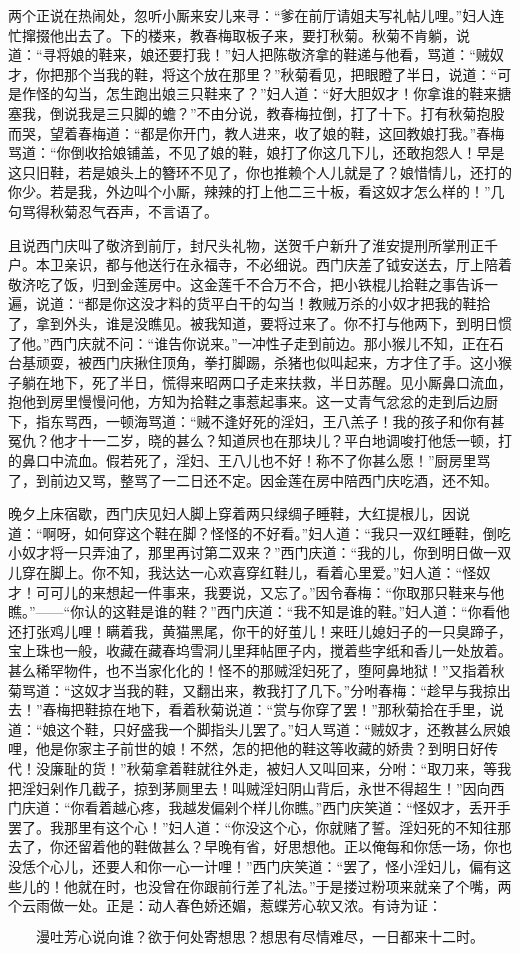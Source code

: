 两个正说在热闹处，忽听小厮来安儿来寻：“爹在前厅请姐夫写礼帖儿哩。”妇人连忙撺掇他出去了。下的楼来，教春梅取板子来，要打秋菊。秋菊不肯躺，说道：“寻将娘的鞋来，娘还要打我！”妇人把陈敬济拿的鞋递与他看，骂道：“贼奴才，你把那个当我的鞋，将这个放在那里？”秋菊看见，把眼瞪了半日，说道：“可是作怪的勾当，怎生跑出娘三只鞋来了？”妇人道：“好大胆奴才！你拿谁的鞋来搪塞我，倒说我是三只脚的蟾？”不由分说，教春梅拉倒，打了十下。打有秋菊抱股而哭，望着春梅道：“都是你开门，教人进来，收了娘的鞋，这回教娘打我。”春梅骂道：“你倒收拾娘铺盖，不见了娘的鞋，娘打了你这几下儿，还敢抱怨人！早是这只旧鞋，若是娘头上的簪环不见了，你也推赖个人儿就是了？娘惜情儿，还打的你少。若是我，外边叫个小厮，辣辣的打上他二三十板，看这奴才怎么样的！”几句骂得秋菊忍气吞声，不言语了。

且说西门庆叫了敬济到前厅，封尺头礼物，送贺千户新升了淮安提刑所掌刑正千户。本卫亲识，都与他送行在永福寺，不必细说。西门庆差了钺安送去，厅上陪着敬济吃了饭，归到金莲房中。这金莲千不合万不合，把小铁棍儿拾鞋之事告诉一遍，说道：“都是你这没才料的货平白干的勾当！教贼万杀的小奴才把我的鞋拾了，拿到外头，谁是没瞧见。被我知道，要将过来了。你不打与他两下，到明日惯了他。”西门庆就不问：“谁告你说来。”一冲性子走到前边。那小猴儿不知，正在石台基顽耍，被西门庆揪住顶角，拳打脚踢，杀猪也似叫起来，方才住了手。这小猴子躺在地下，死了半日，慌得来昭两口子走来扶救，半日苏醒。见小厮鼻口流血，抱他到房里慢慢问他，方知为拾鞋之事惹起事来。这一丈青气忿忿的走到后边厨下，指东骂西，一顿海骂道：“贼不逢好死的淫妇，王八羔子！我的孩子和你有甚冤仇？他才十一二岁，晓的甚么？知道屄也在那块儿？平白地调唆打他恁一顿，打的鼻口中流血。假若死了，淫妇、王八儿也不好！称不了你甚么愿！”厨房里骂了，到前边又骂，整骂了一二日还不定。因金莲在房中陪西门庆吃酒，还不知。

晚夕上床宿歇，西门庆见妇人脚上穿着两只绿绸子睡鞋，大红提根儿，因说道：“啊呀，如何穿这个鞋在脚？怪怪的不好看。”妇人道：“我只一双红睡鞋，倒吃小奴才将一只弄油了，那里再讨第二双来？”西门庆道：“我的儿，你到明日做一双儿穿在脚上。你不知，我达达一心欢喜穿红鞋儿，看着心里爱。”妇人道：“怪奴才！可可儿的来想起一件事来，我要说，又忘了。”因令春梅：“你取那只鞋来与他瞧。”——“你认的这鞋是谁的鞋？”西门庆道：“我不知是谁的鞋。”妇人道：“你看他还打张鸡儿哩！瞒着我，黄猫黑尾，你干的好茧儿！来旺儿媳妇子的一只臭蹄子，宝上珠也一般，收藏在藏春坞雪洞儿里拜帖匣子内，搅着些字纸和香儿一处放着。甚么稀罕物件，也不当家化化的！怪不的那贼淫妇死了，堕阿鼻地狱！”又指着秋菊骂道：“这奴才当我的鞋，又翻出来，教我打了几下。”分咐春梅：“趁早与我掠出去！”春梅把鞋掠在地下，看着秋菊说道：“赏与你穿了罢！”那秋菊拾在手里，说道：“娘这个鞋，只好盛我一个脚指头儿罢了。”妇人骂道：“贼奴才，还教甚么屄娘哩，他是你家主子前世的娘！不然，怎的把他的鞋这等收藏的娇贵？到明日好传代！没廉耻的货！”秋菊拿着鞋就往外走，被妇人又叫回来，分咐：“取刀来，等我把淫妇剁作几截子，掠到茅厕里去！叫贼淫妇阴山背后，永世不得超生！”因向西门庆道：“你看着越心疼，我越发偏剁个样儿你瞧。”西门庆笑道：“怪奴才，丢开手罢了。我那里有这个心！”妇人道：“你没这个心，你就赌了誓。淫妇死的不知往那去了，你还留着他的鞋做甚么？早晚有省，好思想他。正以俺每和你恁一场，你也没恁个心儿，还要人和你一心一计哩！”西门庆笑道：“罢了，怪小淫妇儿，偏有这些儿的！他就在时，也没曾在你跟前行差了礼法。”于是搂过粉项来就亲了个嘴，两个云雨做一处。正是：动人春色娇还媚，惹蝶芳心软又浓。有诗为证：

\[
漫吐芳心说向谁？欲于何处寄想思？
想思有尽情难尽，一日都来十二时。
\]
